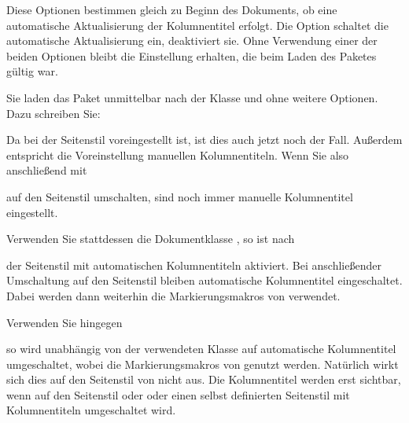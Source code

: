 \begin{Declaration}
\end{Declaration}%
%
%
Diese Optionen bestimmen gleich zu Beginn des Dokuments, ob eine automatische
Aktualisierung der Kolumnentitel erfolgt.  Die Option 
schaltet die automatische Aktualisierung ein,  deaktiviert
sie.
Ohne Verwendung einer der beiden Optionen bleibt die Einstellung
erhalten, die beim Laden des Paketes gültig war.
\begin{Example}
  Sie laden das Paket  unmittelbar nach der Klasse
   und ohne weitere Optionen. Dazu schreiben Sie:
  Da bei  der Seitenstil  voreingestellt
  ist, ist dies auch jetzt noch der Fall. Außerdem entspricht die
  Voreinstellung  manuellen Kolumnentiteln. Wenn Sie
  also anschließend mit
\begin{lstcode}
  \pagestyle{scrheadings}
\end{lstcode}
  auf den Seitenstil  umschalten, sind noch immer
  manuelle Kolumnentitel eingestellt.

  Verwenden Sie stattdessen die Dokumentklasse , so
  ist nach
  der Seitenstil  mit automatischen Kolumnentiteln
  aktiviert. Bei anschließender Umschaltung auf den Seitenstil
   bleiben automatische Kolumnentitel
  eingeschaltet. Dabei werden dann weiterhin die Markierungsmakros von
   verwendet.

  Verwenden Sie hingegen
\begin{lstcode}
  \usepackage[automark]{scrpage2}
\end{lstcode}
  so wird unabhängig von der verwendeten Klasse auf automatische
  Kolumnentitel umgeschaltet, wobei die Markierungsmakros von
   genutzt werden.
  Natürlich wirkt sich dies auf den Seitenstil
   von  nicht aus. Die Kolumnentitel
  werden erst sichtbar, wenn auf den Seitenstil
   oder
   oder einen selbst definierten Seitenstil mit
  Kolumnentiteln umgeschaltet wird.
\end{Example}
\EndIndexGroup


